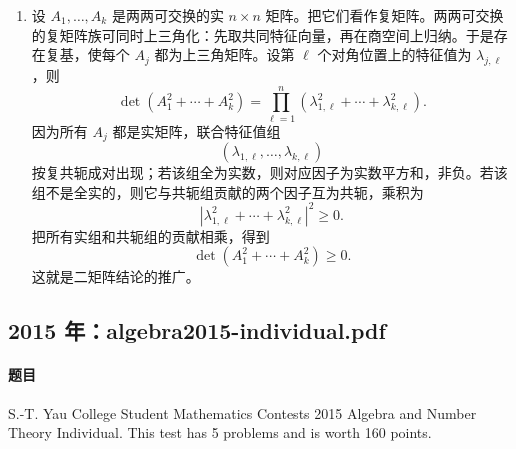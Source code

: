 \documentclass[UTF8,12pt]{ctexart}
\begin{document}
\begin{enumerate}[label=\textbf{\arabic*.},leftmargin=2.2em]
\begin{enumerate}[label=\textbf{(\alph*)},leftmargin=2.4em]
\item 设 \(A_1,\ldots,A_k\) 是两两可交换的实 \(n\times n\) 矩阵。把它们看作复矩阵。两两可交换的复矩阵族可同时上三角化：先取共同特征向量，再在商空间上归纳。于是存在复基，使每个 \(A_j\) 都为上三角矩阵。设第 \(\ell\) 个对角位置上的特征值为 \(\lambda_{j,\ell}\)，则
\[
\det(A_1^2+\cdots+A_k^2)
=\prod_{\ell=1}^n\left(\lambda_{1,\ell}^2+\cdots+\lambda_{k,\ell}^2\right).
\]
因为所有 \(A_j\) 都是实矩阵，联合特征值组
\[
(\lambda_{1,\ell},\ldots,\lambda_{k,\ell})
\]
按复共轭成对出现；若该组全为实数，则对应因子为实数平方和，非负。若该组不是全实的，则它与共轭组贡献的两个因子互为共轭，乘积为
\[
\left|\lambda_{1,\ell}^2+\cdots+\lambda_{k,\ell}^2\right|^2\ge0.
\]
把所有实组和共轭组的贡献相乘，得到
\[
\det(A_1^2+\cdots+A_k^2)\ge0.
\]
这就是二矩阵结论的推广。
\end{enumerate}
\end{enumerate}

\subsection{2015 年：algebra2015-individual.pdf}
\paragraph{题目}
S.-T. Yau College Student Mathematics Contests 2015 Algebra and Number Theory Individual. This test has 5 problems and is worth 160 points.
\end{document}
